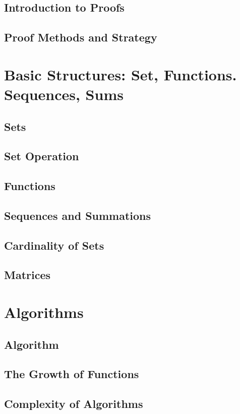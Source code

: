 \documentclass{article}
\begin{document}
\subsection{Introduction to Proofs}
\subsection{Proof Methods and Strategy}

\section{Basic Structures: Set, Functions. Sequences, Sums}

\subsection{Sets}
\subsection{Set Operation}
\subsection{Functions}
\subsection{Sequences and Summations}
\subsection{Cardinality of Sets}
\subsection{Matrices}

\section{Algorithms}

\subsection{Algorithm}
\subsection{The Growth of Functions}
\subsection{Complexity of Algorithms}
\end{document}
